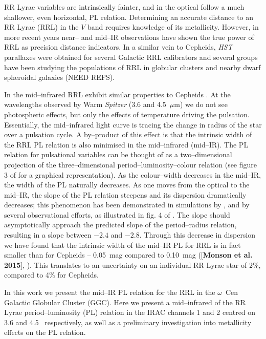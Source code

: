\documentclass[a4paper,fleqn,usenatbib]{mnras}
\begin{document}

RR Lyrae variables are intrinsically fainter, and in the optical follow a much shallower, even horizontal, PL relation. Determining an accurate distance to an RR Lyrae (RRL) in the $V$ band requires knowledge of its metallicity. However, in more recent years near-- and mid--IR observations have shown the true power of RRL as precision distance indicators. In a similar vein to Cepheids, \textit{HST} parallaxes were obtained for several Galactic RRL calibrators \citet{2011AJ....142..187B} and several groups have been studying the populations of RRL in globular clusters and nearby dwarf spheroidal galaxies (NEED REFS). 


In the mid--infrared RRL exhibit similar properties to Cepheids \citep{2013ApJ...776..135M}. At the wavelengths observed by Warm \textit{Spitzer} (3.6 and 4.5~$\mu$m) we do not see photospheric effects, but only the effects of temperature driving the pulsation. Essentially, the mid--infrared light curve is tracing the change in radius of the star over a pulsation cycle. A by--product of this effect is that the intrinsic width of the RRL PL relation is also minimised in the mid--infrared (mid--IR). The PL relation for pulsational variables can be thought of as a two--dimensional projection of the three--dimensional period--luminosity--colour relation (see figure 3 of \citet{1991PASP..103..933M} for a graphical representation). As the colour--width decreases in the mid--IR, the width of the PL naturally decreases. As one moves from the optical to the mid--IR, the slope of the PL relation steepens and its dispersion dramatically decreases; this phenomenon has been demonstrated in simulations by \citet{2004ApJS..154..633C}, and by several observational efforts, as illustrated in fig. 4 of \citet{2013ApJ...776..135M}. The slope should asymptotically approach the predicted slope of the period--radius relation, resulting in a slope between $-2.4$ and $-2.8$. Through this decrease in dispersion we have found that the intrinsic width of the mid--IR PL for RRL is in fact smaller than for Cepheids -- 0.05~mag compared to 0.10~mag ([{\bf Monson et al. 2015}], \citep{2015arXiv150507858N}). This translates to an uncertainty on an individual RR Lyrae star of 2\%, compared to 4\% for Cepheids. 


In this work we present the mid--IR PL relation for the RRL in the $\omega$~Cen Galactic Globular Cluster (GGC). 
Here we present a mid--infrared of the RR Lyrae period--luminosity (PL) relation in the IRAC channels 1 and 2 centred on 3.6 and 4.5 \micron\ respectively, as well as a preliminary investigation into metallicity effects on the PL relation.
\end{document}
